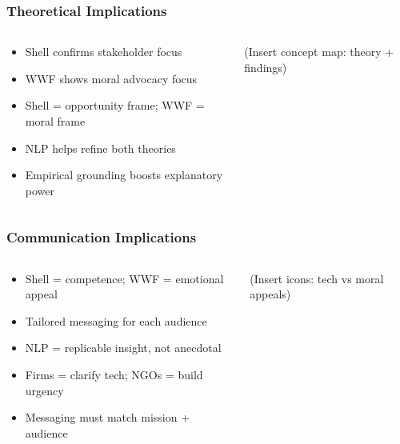 \documentclass[aspectratio=1610]{beamer}
\begin{document}
\begin{frame}
  \frametitle{Theoretical Implications}
  \begin{columns}
    \begin{column}{0.6\textwidth}
      \begin{itemize}
        \item Shell confirms stakeholder focus
        \item WWF shows moral advocacy focus
        \item Shell = opportunity frame; WWF = moral frame
        \item NLP helps refine both theories
        \item Empirical grounding boosts explanatory power
      \end{itemize}
    \end{column}
    \begin{column}{0.4\textwidth}
      (Insert concept map: theory + findings)
    \end{column}
  \end{columns}
\end{frame}

\begin{frame}
  \frametitle{Communication Implications}
  \begin{columns}
    \begin{column}{0.6\textwidth}
      \begin{itemize}
        \item Shell = competence; WWF = emotional appeal
        \item Tailored messaging for each audience
        \item NLP = replicable insight, not anecdotal
        \item Firms = clarify tech; NGOs = build urgency
        \item Messaging must match mission + audience
      \end{itemize}
    \end{column}
    \begin{column}{0.4\textwidth}
      (Insert icons: tech vs moral appeals)
    \end{column}
  \end{columns}
\end{frame}
\end{document}
